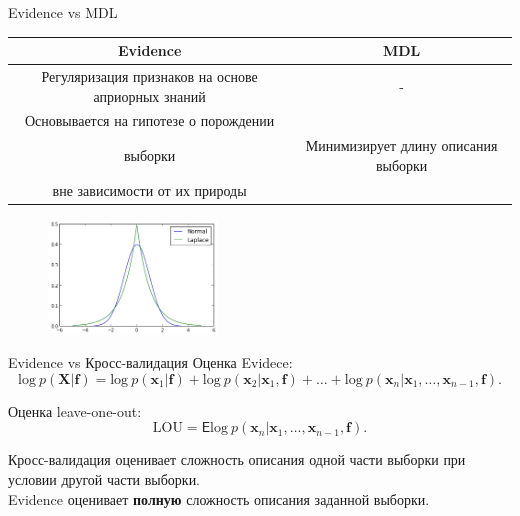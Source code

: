 \documentclass[10pt,pdf,utf8,russian,aspectratio=169]{beamer}
\begin{document}
\begin{frame}{Evidence vs MDL}
\begin{tabular}{ c | c  }
  \hline			
  Evidence & MDL \\
  \hline  
Регуляризация признаков на основе априорных знаний &  - \\
  \hline  
Основывается на гипотезе о порождении\\ выборки & Минимизирует длину описания выборки\\ вне зависимости от их природы \\
  \hline  

\end{tabular}


\begin{figure}
  \centering
 \includegraphics[width=0.4\textwidth]{laplace.png}
\label{fig:1}\qquad

\end{figure}
\end{frame}

\begin{frame}{Evidence vs Кросс-валидация}
Оценка Evidece:
\[
\text{log}~p(\mathbf{X}|\mathbf{f}) = \text{log}~p(\mathbf{x}_1|\mathbf{f}) + \text{log}~p(\mathbf{x}_2|\mathbf{x}_1, \mathbf{f}) + \dots +  \text{log}~p(\mathbf{x}_n|\mathbf{x}_1,\dots,\mathbf{x}_{n-1}, \mathbf{f}).
\]

Оценка leave-one-out:
\[
\text{LOU} = \mathsf{E} \text{log}~p(\mathbf{x}_n|\mathbf{x}_1,\dots,\mathbf{x}_{n-1}, \mathbf{f}).
\]

Кросс-валидация оценивает сложность описания одной части выборки при условии другой части выборки. \\
Evidence оценивает \textbf{полную} сложность описания заданной выборки.
\end{frame}
\end{document}
